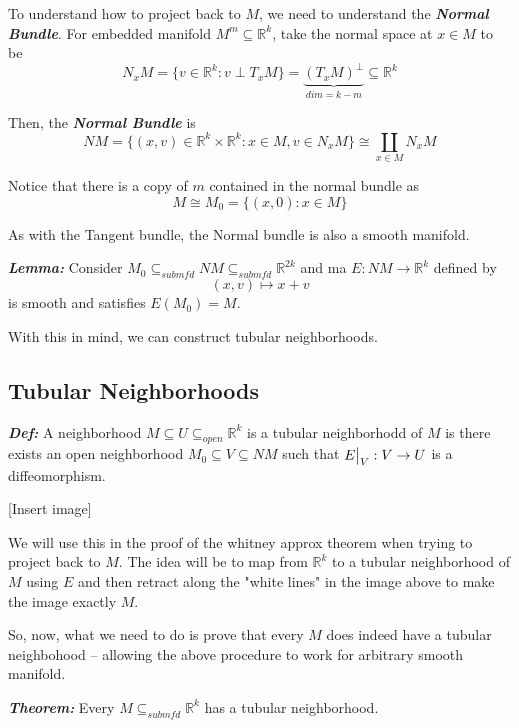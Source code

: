 \documentclass{article}
\newcommand{\R}{\mathbb{R}}
\newcommand{\restr}[2]{{%
  \left.\kern-\nulldelimiterspace %
  #1 %
  \vphantom{\big|} %
  \right|_{#2} %
  }}
\begin{document}
To understand how to project back to $M$, we need to understand the \emph{\textbf{Normal Bundle}}. For embedded manifold $M^m \subseteq \R^k$, take the normal space at $x \in M$ to be 
\[ N_x M = \{ v \in \R^k : v \perp T_xM \} = \underbrace{(T_x M)^{\perp} }_{dim = k-m}\subseteq \R^k \]

Then, the \emph{\textbf{Normal Bundle}} is 
\[ NM = \{ (x, v) \in \R^k \times \R^k : x \in M, v \in N_x M \} \cong \coprod_{x \in M} N_x M \]

Notice that there is a copy of $m$ contained in the normal bundle as 
\[ M \cong M_0 = \{(x, 0):x \in M\} \]

As with the Tangent bundle, the Normal bundle is also a smooth manifold.

\vskip 0.5cm
\begin{dottedbox}
  \textbf{\emph{Lemma:}} Consider $M_0 \subseteq_{submfd} NM \subseteq_{submfd} \R^{2k}$ and ma $E : NM \rightarrow \R^{k}$ defined by 
  \[ (x, v) \mapsto x + v  \]
  is smooth and satisfies $E(M_0) = M$.
\end{dottedbox}

\vskip 0.5cm
With this in mind, we can construct tubular neighborhoods.

\vskip 1cm
\subsection{Tubular Neighborhoods}

\begin{mathdefinitionbox}{}
  \emph{\textbf{Def:}} A neighborhood $M \subseteq U \subseteq_{open} \R^k$ is a tubular neighborhodd of $M$ is there exists an open neighborhood $M_0 \subseteq V \subseteq NM$ such that $\restr{E}{V} : V \rightarrow U$ is a diffeomorphism.
\end{mathdefinitionbox}

\vskip 0.5cm
[Insert image]


\vskip 0.5cm
We will use this in the proof of the whitney approx theorem when trying to project back to $M$. The idea will be to map from $\R^k$ to a tubular neighborhood of $M$ using $E$ and then retract along the "white lines" in the image above to make the image exactly $M$.

\vskip 0.5cm
So, now, what we need to do is prove that every $M$ does indeed have a tubular neighbohood -- allowing the above procedure to work for arbitrary smooth manifold.

\vskip 0.5cm
\begin{dottedbox}
  \emph{\textbf{Theorem:}} Every $M \subseteq_{submfd} \R^k$ has a tubular neighborhood.
\end{dottedbox}
\end{document}

